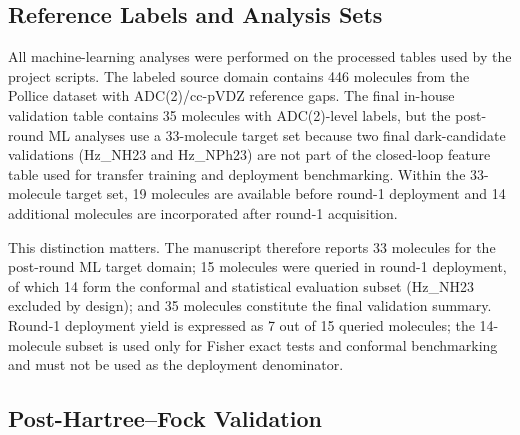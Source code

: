 \documentclass[journal=jcisd8,manuscript=article]{achemso}
\begin{document}
\subsection{Reference Labels and Analysis Sets}

All machine-learning analyses were performed on the processed tables used by the project scripts. The labeled source domain contains 446 molecules from the Pollice dataset with ADC(2)/cc-pVDZ reference gaps.\cite{Pollice2021} The final in-house validation table contains 35 molecules with ADC(2)-level labels, but the post-round ML analyses use a 33-molecule target set because two final dark-candidate validations (Hz\_NH23 and Hz\_NPh23) are not part of the closed-loop feature table used for transfer training and deployment benchmarking. Within the 33-molecule target set, 19 molecules are available before round-1 deployment and 14 additional molecules are incorporated after round-1 acquisition.

This distinction matters. The manuscript therefore reports 33 molecules for the post-round ML target domain; 15 molecules were queried in round-1 deployment, of which 14 form the conformal and statistical evaluation subset (Hz\_NH23 excluded by design); and 35 molecules constitute the final validation summary. Round-1 deployment yield is expressed as 7 out of 15 queried molecules; the 14-molecule subset is used only for Fisher exact tests and conformal benchmarking and must not be used as the deployment denominator.

\subsection{Post-Hartree--Fock Validation}
\end{document}

